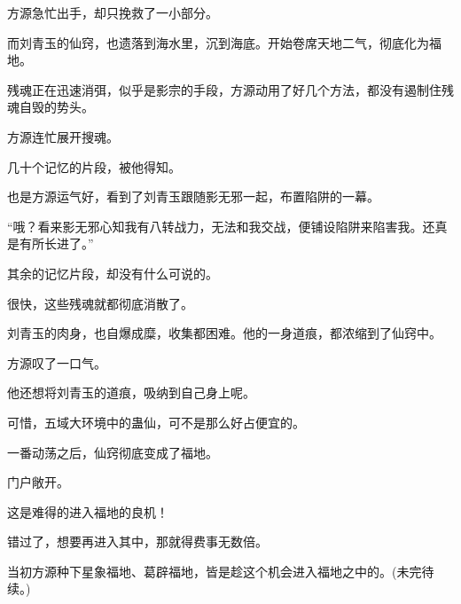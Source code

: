 \begin{this_body}
方源急忙出手，却只挽救了一小部分。

而刘青玉的仙窍，也遗落到海水里，沉到海底。开始卷席天地二气，彻底化为福地。

残魂正在迅速消弭，似乎是影宗的手段，方源动用了好几个方法，都没有遏制住残魂自毁的势头。

方源连忙展开搜魂。

几十个记忆的片段，被他得知。

也是方源运气好，看到了刘青玉跟随影无邪一起，布置陷阱的一幕。

“哦？看来影无邪心知我有八转战力，无法和我交战，便铺设陷阱来陷害我。还真是有所长进了。”

其余的记忆片段，却没有什么可说的。

很快，这些残魂就都彻底消散了。

刘青玉的肉身，也自爆成糜，收集都困难。他的一身道痕，都浓缩到了仙窍中。

方源叹了一口气。

他还想将刘青玉的道痕，吸纳到自己身上呢。

可惜，五域大环境中的蛊仙，可不是那么好占便宜的。

一番动荡之后，仙窍彻底变成了福地。

门户敞开。

这是难得的进入福地的良机！

错过了，想要再进入其中，那就得费事无数倍。

当初方源种下星象福地、葛辟福地，皆是趁这个机会进入福地之中的。(未完待续。)

\end{this_body}


